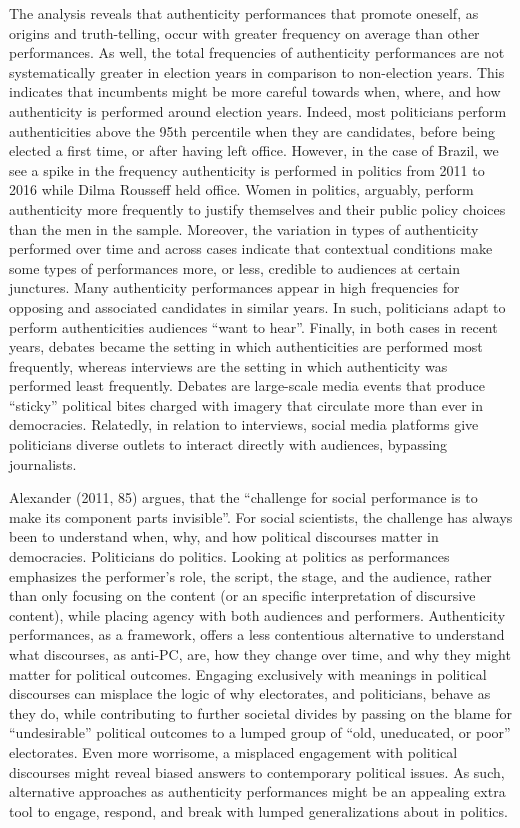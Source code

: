 \documentclass[smallextended]{svjour3}       %
\begin{document}
The analysis reveals that authenticity performances that promote
oneself, as origins and truth-telling, occur with greater frequency on
average than other performances. As well, the total frequencies of
authenticity performances are not systematically greater in election
years in comparison to non-election years. This indicates that
incumbents might be more careful towards when, where, and how
authenticity is performed around election years. Indeed, most
politicians perform authenticities above the 95th percentile when they
are candidates, before being elected a first time, or after having left
office. However, in the case of Brazil, we see a spike in the frequency
authenticity is performed in politics from 2011 to 2016 while Dilma
Rousseff held office. Women in politics, arguably, perform authenticity
more frequently to justify themselves and their public policy choices
than the men in the sample. Moreover, the variation in types of
authenticity performed over time and across cases indicate that
contextual conditions make some types of performances more, or less,
credible to audiences at certain junctures. Many authenticity
performances appear in high frequencies for opposing and associated
candidates in similar years. In such, politicians adapt to perform
authenticities audiences ``want to hear''. Finally, in both cases in
recent years, debates became the setting in which authenticities are
performed most frequently, whereas interviews are the setting in which
authenticity was performed least frequently. Debates are large-scale
media events that produce ``sticky'' political bites charged with
imagery that circulate more than ever in democracies. Relatedly, in
relation to interviews, social media platforms give politicians diverse
outlets to interact directly with audiences, bypassing journalists.

Alexander (2011, 85) argues, that the ``challenge for social performance
is to make its component parts invisible''. For social scientists, the
challenge has always been to understand when, why, and how political
discourses matter in democracies. Politicians do politics. Looking at
politics as performances emphasizes the performer's role, the script,
the stage, and the audience, rather than only focusing on the content
(or an specific interpretation of discursive content), while placing
agency with both audiences and performers. Authenticity performances, as
a framework, offers a less contentious alternative to understand what
discourses, as anti-PC, are, how they change over time, and why they
might matter for political outcomes. Engaging exclusively with meanings
in political discourses can misplace the logic of why electorates, and
politicians, behave as they do, while contributing to further societal
divides by passing on the blame for ``undesirable'' political outcomes
to a lumped group of ``old, uneducated, or poor'' electorates. Even more
worrisome, a misplaced engagement with political discourses might reveal
biased answers to contemporary political issues. As such, alternative
approaches as authenticity performances might be an appealing extra tool
to engage, respond, and break with lumped generalizations about in
politics.
\end{document}
